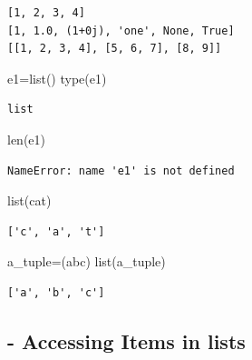 \documentclass[
  letterpaper,
  DIV=11,
  numbers=noendperiod]{scrreprt}
\newenvironment{Shaded}{\begin{snugshade}}{\end{snugshade}}
\newcommand{\BuiltInTok}[1]{\textcolor[rgb]{0.00,0.23,0.31}{#1}}
\newcommand{\NormalTok}[1]{\textcolor[rgb]{0.00,0.23,0.31}{#1}}
\newcommand{\OperatorTok}[1]{\textcolor[rgb]{0.37,0.37,0.37}{#1}}
\newcommand{\StringTok}[1]{\textcolor[rgb]{0.13,0.47,0.30}{#1}}
\begin{document}
\begin{verbatim}
[1, 2, 3, 4]
[1, 1.0, (1+0j), 'one', None, True]
[[1, 2, 3, 4], [5, 6, 7], [8, 9]]
\end{verbatim}

\begin{Shaded}
\begin{Highlighting}[]
\NormalTok{e1}\OperatorTok{=}\BuiltInTok{list}\NormalTok{()}
\BuiltInTok{type}\NormalTok{(e1)}
\end{Highlighting}
\end{Shaded}

\begin{verbatim}
list
\end{verbatim}

\begin{Shaded}
\begin{Highlighting}[]
\BuiltInTok{len}\NormalTok{(e1)}
\end{Highlighting}
\end{Shaded}

\begin{verbatim}
NameError: name 'e1' is not defined
\end{verbatim}

\begin{Shaded}
\begin{Highlighting}[]
\BuiltInTok{list}\NormalTok{(}\StringTok{\textquotesingle{}cat\textquotesingle{}}\NormalTok{)}
\end{Highlighting}
\end{Shaded}

\begin{verbatim}
['c', 'a', 't']
\end{verbatim}

\begin{Shaded}
\begin{Highlighting}[]
\NormalTok{a\_tuple}\OperatorTok{=}\NormalTok{(}\StringTok{\textquotesingle{}abc\textquotesingle{}}\NormalTok{)}
\BuiltInTok{list}\NormalTok{(a\_tuple)}
\end{Highlighting}
\end{Shaded}

\begin{verbatim}
['a', 'b', 'c']
\end{verbatim}

\subsection{- Accessing Items in lists}\label{accessing-items-in-lists}
\end{document}
